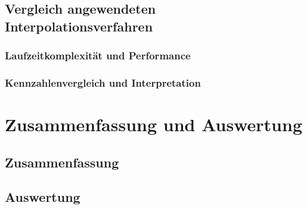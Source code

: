 \documentclass[
fontsize=10pt, 
listof = totoc,
parskip = half	
]{report}
\begin{document}
\section{Vergleich angewendeten Interpolationsverfahren}

\subsection{Laufzeitkomplexität und Performance}

\subsection{Kennzahlenvergleich und Interpretation}

\chapter{Zusammenfassung und Auswertung}

\section{Zusammenfassung}

\section{Auswertung}




\end{document}
